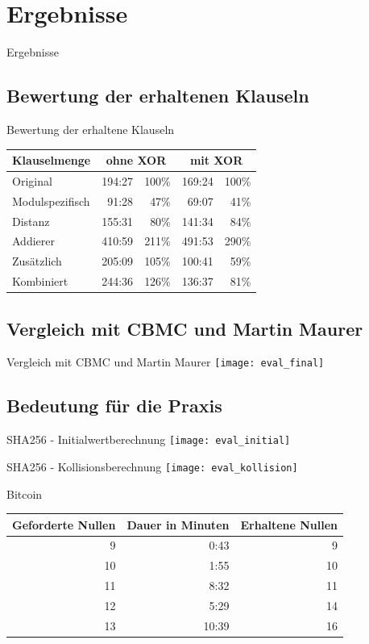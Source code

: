 \documentclass{beamer}
\begin{document}
\section{Ergebnisse}
  \begin{frame}{}
    \begin{center}
      \Huge Ergebnisse
    \end{center}
  \end{frame}
  \subsection{Bewertung der erhaltenen Klauseln}
    \begin{frame}{Bewertung der erhaltene Klauseln}
      \begin{tabular}{l|rr|rr}
	Klauselmenge    & \multicolumn{2}{c|}{ohne XOR} & \multicolumn{2}{c}{mit XOR} \\
	\hline
	Original        &  194:27 & 100\% &   169:24 & 100\% \\
	\hline
	Modulspezifisch &   91:28 &  47\% &    69:07 &  41\% \\
	Distanz         &  155:31 &  80\% &   141:34 &  84\% \\
	Addierer        &  410:59 & 211\% &   491:53 & 290\% \\
	Zusätzlich      &  205:09 & 105\% &   100:41 &  59\% \\
	\hline
	Kombiniert      &  244:36 & 126\% &   136:37 &  81\%    
      \end{tabular}
    \end{frame}
  \subsection{Vergleich mit CBMC und Martin Maurer}
    \begin{frame}{Vergleich mit CBMC und Martin Maurer}
      \texttt{[image: eval\_final]}
    \end{frame}
  \subsection{Bedeutung für die Praxis}
    \begin{frame}{SHA256 - Initialwertberechnung}
      \texttt{[image: eval\_initial]}
    \end{frame}
    \begin{frame}{SHA256 - Kollisionsberechnung}
      \texttt{[image: eval\_kollision]}
    \end{frame}
    \begin{frame}{Bitcoin}
      \begin{tabular}{r|r|r}
        Geforderte Nullen & Dauer in Minuten & Erhaltene Nullen \\
        \hline
         9 &  0:43 &  9 \\
        10 &  1:55 & 10 \\
        11 &  8:32 & 11 \\
        12 &  5:29 & 14 \\
        13 & 10:39 & 16
      \end{tabular}
    \end{frame}
\end{document}
